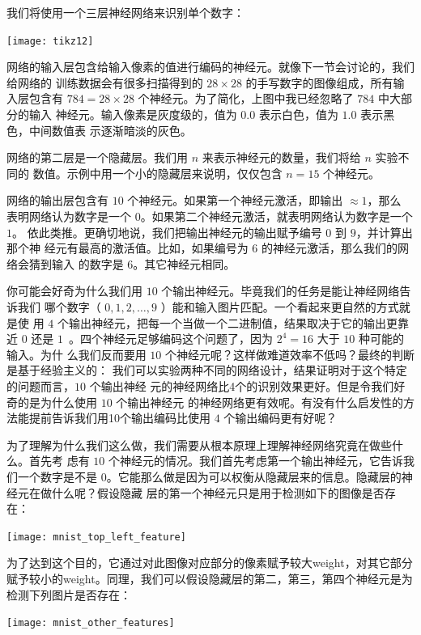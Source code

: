 我们将使用一个三层神经网络来识别单个数字：
\begin{center}
  \texttt{[image: tikz12]}
\end{center}

网络的输入层包含给输入像素的值进行编码的神经元。就像下一节会讨论的，我们给网络的
训练数据会有很多扫描得到的 $28 \times 28$ 的手写数字的图像组成，所有输入层包含有
$784 = 28 \times 28$ 个神经元。为了简化，上图中我已经忽略了 $784$ 中大部分的输入
神经元。输入像素是灰度级的，值为 $0.0$ 表示白色，值为 $1.0$ 表示黑色，中间数值表
示逐渐暗淡的灰色。

网络的第二层是一个隐藏层。我们用 $n$ 来表示神经元的数量，我们将给 $n$ 实验不同的
数值。示例中用一个小的隐藏层来说明，仅仅包含 $n=15$ 个神经元。

网络的输出层包含有 $10$ 个神经元。如果第一个神经元激活，即输出 $\approx 1$，那么
表明网络认为数字是一个 $0$。如果第二个神经元激活，就表明网络认为数字是一个 $1$。
依此类推。更确切地说，我们把输出神经元的输出赋予编号 $0$ 到 $9$，并计算出那个神
经元有最高的激活值。比如，如果编号为 $6$ 的神经元激活，那么我们的网络会猜到输入
的数字是 $6$。其它神经元相同。

你可能会好奇为什么我们用 $10$ 个输出神经元。毕竟我们的任务是能让神经网络告诉我们
哪个数字（ $0, 1, 2, \ldots, 9$ ）能和输入图片匹配。一个看起来更自然的方式就是使
用 $4$ 个输出神经元，把每一个当做一个二进制值，结果取决于它的输出更靠近 $0$ 还是
$1$~。四个神经元足够编码这个问题了，因为 $2^4 = 16$ 大于 $10$ 种可能的输入。为什
么我们反而要用 $10$ 个神经元呢？这样做难道效率不低吗？最终的判断是基于经验主义的：
我们可以实验两种不同的网络设计，结果证明对于这个特定的问题而言，$10$ 个输出神经
元的神经网络比4个的识别效果更好。但是令我们好奇的是为什么使用 $10$ 个输出神经元
的神经网络更有效呢。有没有什么启发性的方法能提前告诉我们用10个输出编码比使用 $4$
个输出编码更有好呢？

为了理解为什么我们这么做，我们需要从根本原理上理解神经网络究竟在做些什么。首先考
虑有 $10$ 个神经元的情况。我们首先考虑第一个输出神经元，它告诉我们一个数字是不是
0。它能那么做是因为可以权衡从隐藏层来的信息。隐藏层的神经元在做什么呢？假设隐藏
层的第一个神经元只是用于检测如下的图像是否存在：
\begin{center}
  \texttt{[image: mnist\_top\_left\_feature]}
\end{center}

为了达到这个目的，它通过对此图像对应部分的像素赋予较大\gls*{weight}，对其它部分
赋予较小的\gls*{weight}。同理，我们可以假设隐藏层的第二，第三，第四个神经元是为
检测下列图片是否存在：
\begin{center}
  \texttt{[image: mnist\_other\_features]}
\end{center}

